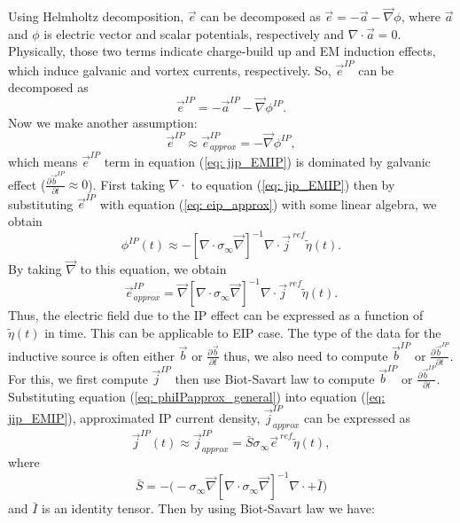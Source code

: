 \documentclass[a4paper, 11pt]{article}
\renewcommand{\div}{\nabla\cdot}
\newcommand{\grad}{\vec \nabla}
\newcommand{\siginf}{\sigma_\infty}
\renewcommand {\j}  { {\vec j} }
\renewcommand {\b}  { {\vec b} }
\newcommand {\e}  { {\vec e} }
\newcommand{\peta}{\tilde{\eta}}
\newcommand{\eref}{\e^{\ ref}}
\begin{document}
Using Helmholtz decomposition, $\e$ can be decomposed as $\e=-\vec{a}-\grad\phi$, where $\vec{a}$ and $\phi$ is electric vector and scalar potentials, respectively and $\div\vec{a}=0$. Physically, those two terms indicate charge-build up and EM induction effects, which induce galvanic and vortex currents, respectively. So, $\e^{IP}$ can be decomposed as
\begin{equation}
  \e^{IP}=-\vec{a}^{IP}-\grad\phi^{IP}.
  \label{eq: eip_helmholtz}
\end{equation}
Now we make another assumption:
\begin{equation}
  \e^{IP} \approx  \e^{IP}_{approx} = -\grad\phi^{IP},
  \label{eq: eip_approx}
\end{equation}
which means $\e^{IP}$ term in equation (\ref{eq: jip_EMIP}) is dominated by galvanic effect ($\frac{\partial\b^{IP}}{\partial t}\approx 0$). First taking $\div$ to equation (\ref{eq: jip_EMIP}) then by substituting  $\e^{IP}$ with equation (\ref{eq: eip_approx}) with some linear algebra, we obtain
\begin{equation}
  \phi^{IP}(t) \approx -[\div \siginf\grad]^{-1}\div\j^{\ ref}\peta(t).
  \label{eq: phiIPapprox_general}
\end{equation}
By taking $\grad$ to this equation, we obtain 
\begin{equation}
    \e^{IP}_{approx} = \grad[\div \siginf\grad]^{-1}\div\j^{\ ref}\peta(t).
    \label{eq: eip_approx_full}
\end{equation}
Thus, the electric field due to the IP effect can be expressed as a function of $\peta(t)$ in time. This can be applicable to EIP case.   
The type of the data for the inductive source is often either $\b$ or $\frac{\partial \b}{\partial t}$ thus, we also need to compute $\b^{IP}$ or $\frac{\partial \b^{IP}}{\partial t}$.
For this, we first compute $\j^{IP}$ then use Biot-Savart law to compute $\b^{IP}$ or $\frac{\partial \b^{IP}}{\partial t}$. 
Substituting equation (\ref{eq: phiIPapprox_general}) into equation (\ref{eq: jip_EMIP}), approximated IP current density, $\j^{IP}_{approx}$ can be expressed as
\begin{equation}
  \j^{IP}(t) \approx \j^{IP}_{approx} = \bar{S}\siginf\eref\peta(t),
  \label{eq: jip_approx}
\end{equation}
where
\begin{equation}
  \bar{S} = -\Big(-\siginf\grad[\div \siginf\grad]^{-1}\div+\bar{I}\Big)
\end{equation}
and $\bar{I}$ is an identity tensor. Then by using Biot-Savart law we have:
\end{document}
